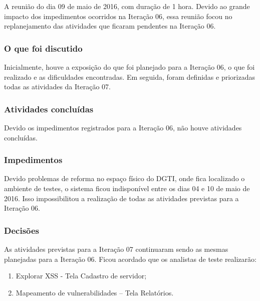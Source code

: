 \documentclass[
    12pt,               %
    openright,          %
    oneside,            %
    a4paper,            %
    section=TITLE,     %
    english,            %
    french,             %
    spanish,            %
    brazil              %
    ]{abntex2}
\begin{document}
A reunião do dia 09 de maio de 2016, com duração de 1 hora. Devido ao grande impacto dos impedimentos ocorridos na Iteração 06, essa reunião focou no replanejamento das atividades que ficaram pendentes na Iteração 06.



\subsubsection*{O que foi discutido}

Inicialmente, houve a exposição do que foi planejado para a Iteração 06, o que foi realizado e as dificuldades encontradas. Em seguida, foram definidas e priorizadas todas as atividades da Iteração 07.



\subsubsection*{Atividades concluídas}

Devido os impedimentos registrados para a Iteração 06, não houve atividades concluídas.



\subsubsection*{Impedimentos}

Devido problemas de reforma no espaço físico do DGTI, onde fica localizado o ambiente de testes, o sistema ficou indisponível entre os dias 04 e 10 de maio de 2016. Isso impossibilitou a realização de todas as atividades previstas para a Iteração 06.



\subsubsection*{Decisões~}

As atividades previstas para a Iteração 07 continuaram sendo as mesmas planejadas para a Iteração 06. Ficou acordado que os analistas de teste realizarão:



\begin{enumerate}[start=1]
	
\item Explorar XSS - Tela Cadastro de servidor;
	
\item Mapeamento de vulnerabilidades -- Tela Relatórios.

\end{enumerate}
\end{document}
